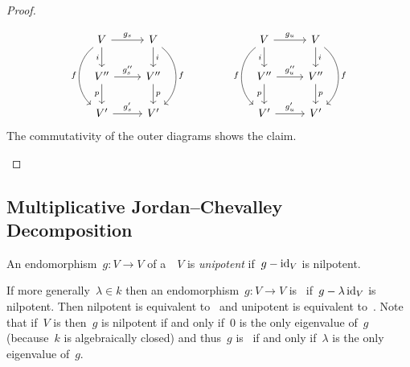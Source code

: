 \begin{proof}
\begin{enumerate}
\[\begin{tikzcd}
            V
            \arrow{r}[above]{g_s}
            \arrow{d}[left]{i}
            \arrow[bend right = 50]{dd}[left]{f}
          & V
            \arrow{d}[right]{i}
            \arrow[bend left = 50]{dd}[right]{f}
          \\
            V''
            \arrow{r}[above]{g''_s}
            \arrow{d}[left]{p}
          & V''
            \arrow{d}[right]{p}
          \\
            V'
            \arrow{r}[above]{g'_s}
          & V'
        \end{tikzcd}
        \qquad
        \qquad
        \begin{tikzcd}
            V
            \arrow{r}[above]{g_u}
            \arrow{d}[left]{i}
            \arrow[bend right = 50]{dd}[left]{f}
          & V
            \arrow{d}[right]{i}
            \arrow[bend left = 50]{dd}[right]{f}
          \\
            V''
            \arrow{r}[above]{g''_u}
            \arrow{d}[left]{p}
          & V''
            \arrow{d}[right]{p}
          \\
            V'
            \arrow{r}[above]{g'_u}
          & V'
        \end{tikzcd}
      \]
      The commutativity of the outer diagrams shows the claim.
    \qedhere
  \end{enumerate}
\end{proof}









\subsection{Multiplicative Jordan--Chevalley Decomposition}


\begin{definition}
  An endomorphism~$g \colon V \to V$ of a~~$V$ is \emph{unipotent} if~$g - \operatorname{id}_V$ is nilpotent.
\end{definition}


\begin{remark}
  If more generally~$\lambda \in k$ then an endomorphism~$g \colon V \to V$ is~\emph{} if~$g - \lambda \operatorname{id}_V$ is nilpotent.
  Then nilpotent is equivalent to~ and unipotent is equivalent to~.
  Note that if~$V$ is  then~$g$ is nilpotent if and only if~$0$ is the only eigenvalue of~$g$ (because~$k$ is algebraically closed) and thus~$g$ is~ if and only if~$\lambda$ is the only eigenvalue of~$g$.
\end{remark}



